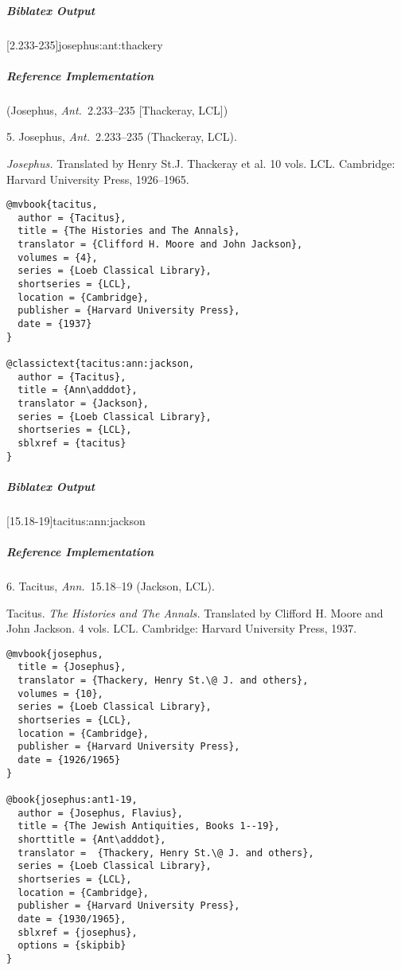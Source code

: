 \documentclass[a4paper]{article}
\newenvironment{biboutput}{%
  \subparagraph{Biblatex Output}
}{\color{black}}
\newenvironment{refimp}{%
  \subparagraph{Reference Implementation}
  \color{reference-colour}
  \rm
}{\par\color{black}}
\begin{document}
\begin{biboutput}
  [2.233-235]{josephus:ant:thackery}
\end{biboutput}

\begin{refimp}
  (Josephus, \emph{Ant.}\ 2.233–235 [Thackeray, LCL])

  \hspace*{\bibindent}5. Josephus, \emph{Ant.}\ 2.233–235 (Thackeray, LCL).

  \hangindent\bibindent \emph{Josephus.} Translated by Henry St.\@ J.
  Thackeray et al. 10 vols. LCL. Cambridge: Harvard University Press,
  1926–1965.

\end{refimp}

\medskip

\begin{lstlisting}
@mvbook{tacitus,
  author = {Tacitus},
  title = {The Histories and The Annals},
  translator = {Clifford H. Moore and John Jackson},
  volumes = {4},
  series = {Loeb Classical Library},
  shortseries = {LCL},
  location = {Cambridge},
  publisher = {Harvard University Press},
  date = {1937}
}

@classictext{tacitus:ann:jackson,
  author = {Tacitus},
  title = {Ann\adddot},
  translator = {Jackson},
  series = {Loeb Classical Library},
  shortseries = {LCL},
  sblxref = {tacitus}
}
\end{lstlisting}

\begin{biboutput}
  [15.18-19]{tacitus:ann:jackson}
\end{biboutput}

\begin{refimp}
  \hspace*{\bibindent}6. Tacitus, \emph{Ann.}\ 15.18–19 (Jackson, LCL).

  \hangindent\bibindent Tacitus. \emph{The Histories and The Annals.}
  Translated by Clifford H. Moore and John Jackson. 4 vols. LCL. Cambridge:
  Harvard University Press, 1937.

\end{refimp}

\medskip

\begin{lstlisting}
@mvbook{josephus,
  title = {Josephus},
  translator = {Thackery, Henry St.\@ J. and others},
  volumes = {10},
  series = {Loeb Classical Library},
  shortseries = {LCL},
  location = {Cambridge},
  publisher = {Harvard University Press},
  date = {1926/1965}
}

@book{josephus:ant1-19,
  author = {Josephus, Flavius},
  title = {The Jewish Antiquities, Books 1--19},
  shorttitle = {Ant\adddot},
  translator =  {Thackery, Henry St.\@ J. and others},
  series = {Loeb Classical Library},
  shortseries = {LCL},
  location = {Cambridge},
  publisher = {Harvard University Press},
  date = {1930/1965},
  sblxref = {josephus},
  options = {skipbib}
}
\end{lstlisting}
\end{document}
